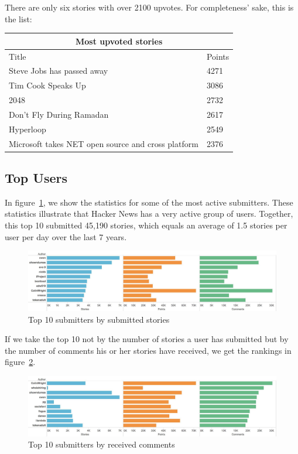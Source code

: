 There are only six stories with over 2100 upvotes. For completeness' sake, this is the list:
\begin{center}
    \begin{tabular}{|p{=8.5cm}|p{2cm}|}
       \hline
       \multicolumn{2}{|c|}{Most upvoted stories} \\
       \hline
       Title 																				& Points \\
       \hline
       Steve Jobs has passed away 										& 4271\\
		Tim Cook Speaks Up														& 3086\\
		2048																			& 2732\\
		Don't Fly During Ramadan											& 2617\\
		Hyperloop																		& 2549\\
		Microsoft takes NET open source and cross platform	& 2376\\
        \hline
    \end{tabular}
\end{center}

\subsection{Top Users}
In figure~\ref{fig:top10ByStories}, we show the statistics for some of the most active submitters. These statistics illustrate that Hacker News has a very active group of users. Together, this top 10 submitted 45,190 stories, which equals an average of 1.5 stories per user per day over the last 7 years.
\begin{figure}[ht!]
	\caption{Top 10 submitters by submitted stories}
	\label{fig:top10ByStories}
	\centering
	\includegraphics[width=12cm]{top10ByStories}
\end{figure}

If we take the top 10 not by the number of stories a user has submitted but by the number of comments his or her stories have received, we get the rankings in figure~\ref{fig:top10ByComments}.

\begin{figure}[ht!]
	\caption{Top 10 submitters by received comments}
	\label{fig:top10ByComments}
	\centering
	\includegraphics[width=12cm]{top10ByComments}
\end{figure}

